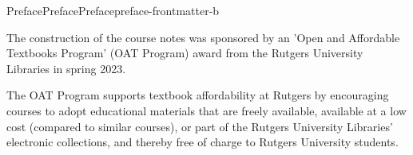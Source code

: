 \documentclass[oneside,10pt,]{book}
\numberwithin{equation}{section}
\begin{document}
\begin{preface}{Preface}{Preface}{}{Preface}{}{}{preface-frontmatter-b}
\par
The construction of the course notes was sponsored by an 'Open and Affordable Textbooks Program' (OAT Program) award from the Rutgers University Libraries in spring 2023.%
\par
The OAT Program supports textbook affordability at Rutgers by encouraging courses to adopt educational materials that are freely available, available at a low cost (compared to similar courses), or part of the Rutgers University Libraries' electronic collections, and thereby free of charge to Rutgers University students.%
\end{preface}
\setcounter{tocdepth}{1}
\renewcommand*\contentsname{Contents}
\tableofcontents
\mainmatter
%
%
\typeout{************************************************}
\typeout{************************************************}
%
\end{document}
